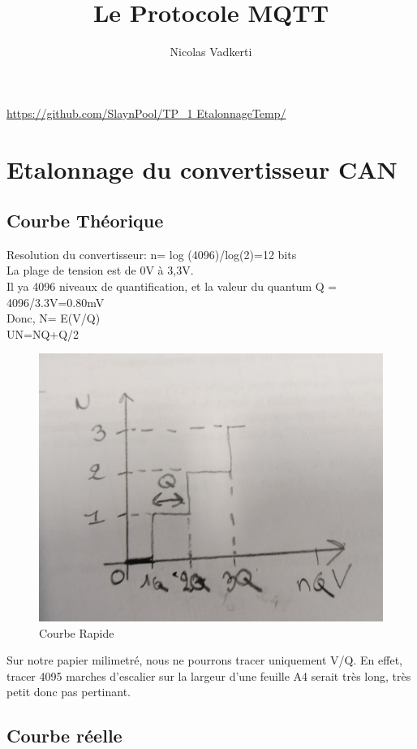 \documentclass[10pt,a4paper]{article}
\title{Le Protocole MQTT}
\author{Nicolas Vadkerti}
\begin{document}
\maketitle


\url{https://github.com/SlaynPool/TP_1 EtalonnageTemp/}
\section{Etalonnage du convertisseur CAN}
\subsection{Courbe Théorique}

Resolution du convertisseur: n= log (4096)/log(2)=12 bits\\
La plage de tension est de 0V à 3,3V.\\
Il ya 4096 niveaux de quantification,
et la valeur du quantum Q = 4096/3.3V=0.80mV\\
Donc, N= E(V/Q)\\
UN=NQ+Q/2

\begin{figure}[h!]
\centering
\includegraphics[scale=0.20]{image/1.jpg}
\caption{Courbe Rapide}
\label{fig:net }
\end{figure}


 Sur notre papier milimetré, nous ne pourrons tracer uniquement V/Q. En effet, tracer 4095 marches d'escalier sur la largeur d'une feuille A4 serait très long, très petit donc pas pertinant.
 
 
 \subsection{Courbe réelle}
 
\end{document}
